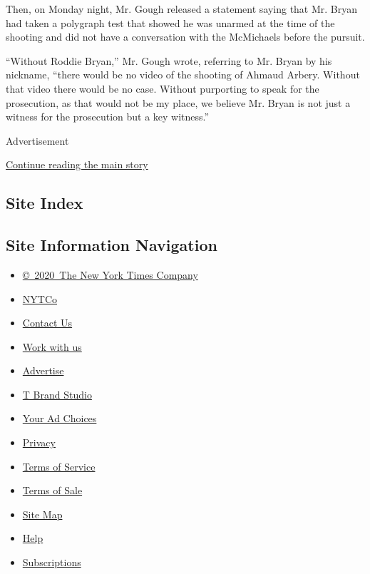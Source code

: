 Then, on Monday night, Mr. Gough released a statement saying that Mr.
Bryan had taken a polygraph test that showed he was unarmed at the time
of the shooting and did not have a conversation with the McMichaels
before the pursuit.

``Without Roddie Bryan,'' Mr. Gough wrote, referring to Mr. Bryan by his
nickname, ``there would be no video of the shooting of Ahmaud Arbery.
Without that video there would be no case. Without purporting to speak
for the prosecution, as that would not be my place, we believe Mr. Bryan
is not just a witness for the prosecution but a key witness.''

Advertisement

\protect\hyperlink{after-bottom}{Continue reading the main story}

\hypertarget{site-index}{%
\subsection{Site Index}\label{site-index}}

\hypertarget{site-information-navigation}{%
\subsection{Site Information
Navigation}\label{site-information-navigation}}

\begin{itemize}
\tightlist
\item
  \href{https://help.nytimes3xbfgragh.onion/hc/en-us/articles/115014792127-Copyright-notice}{©~2020~The
  New York Times Company}
\end{itemize}

\begin{itemize}
\tightlist
\item
  \href{https://www.nytco.com/}{NYTCo}
\item
  \href{https://help.nytimes3xbfgragh.onion/hc/en-us/articles/115015385887-Contact-Us}{Contact
  Us}
\item
  \href{https://www.nytco.com/careers/}{Work with us}
\item
  \href{https://nytmediakit.com/}{Advertise}
\item
  \href{http://www.tbrandstudio.com/}{T Brand Studio}
\item
  \href{https://www.nytimes3xbfgragh.onion/privacy/cookie-policy\#how-do-i-manage-trackers}{Your
  Ad Choices}
\item
  \href{https://www.nytimes3xbfgragh.onion/privacy}{Privacy}
\item
  \href{https://help.nytimes3xbfgragh.onion/hc/en-us/articles/115014893428-Terms-of-service}{Terms
  of Service}
\item
  \href{https://help.nytimes3xbfgragh.onion/hc/en-us/articles/115014893968-Terms-of-sale}{Terms
  of Sale}
\item
  \href{https://spiderbites.nytimes3xbfgragh.onion}{Site Map}
\item
  \href{https://help.nytimes3xbfgragh.onion/hc/en-us}{Help}
\item
  \href{https://www.nytimes3xbfgragh.onion/subscription?campaignId=37WXW}{Subscriptions}
\end{itemize}
